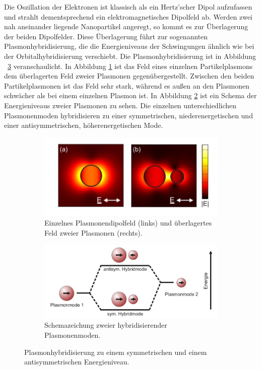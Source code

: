Die Oszillation der Elektronen ist klassisch als ein Hertz'scher Dipol aufzufassen und strahlt dementsprechend ein elektromagnetisches Dipolfeld ab.
Werden zwei nah aneinander liegende Nanopartikel angeregt, so kommt es zur Überlagerung der beiden Dipolfelder. Diese Überlagerung führt zur sogenannten Plasmonhybridisierung, die die Energieniveaus der Schwingungen ähnlich wie bei der Orbitalhybridisierung verschiebt. Die Plasmonhybridisierung ist in Abbildung ~\ref{fig:hybrid} veranschaulicht. \cite{bayreuth} In Abbildung \ref{fig:a} ist das Feld eines einzelnen Partikelplasmons dem überlagerten Feld zweier Plasmonen gegenübergestellt. Zwischen den beiden Partikelplasmonen ist das Feld sehr stark, während es außen an den Plasmonen schwächer als bei einem einzelnen Plasmon ist. In Abbildung \ref{fig:b} ist ein Schema der Energieniveaus zweier Plasmonen zu sehen. Die einzelnen unterschiedlichen Plasmonenmoden hybridisieren zu einer symmetrischen, niederenergetischen und einer antisymmetrischen, höherenergetischen Mode.
\begin{figure}[H]
  \centering
  \begin{subfigure}{0.49\textwidth}
    \includegraphics[width=\textwidth]{plots/hybrid.jpg}
    \caption{Einzelnes Plasmonendipolfeld (links) und überlagertes Feld zweier Plasmonen (rechts).}
    \label{fig:a}
  \end{subfigure}
  \begin{subfigure}{0.49\textwidth}
    \includegraphics[width=\textwidth]{plots/hybridschema.jpg}
    \caption{Schemazeichung zweier hybridisierender Plasmonenmoden.}
    \label{fig:b}
  \end{subfigure}
  \caption{Plasmonhybridisierung zu einem symmetrischen und einem antisymmetrischen Energieniveau. \cite{bayreuth}}
  \label{fig:hybrid}
\end{figure}

